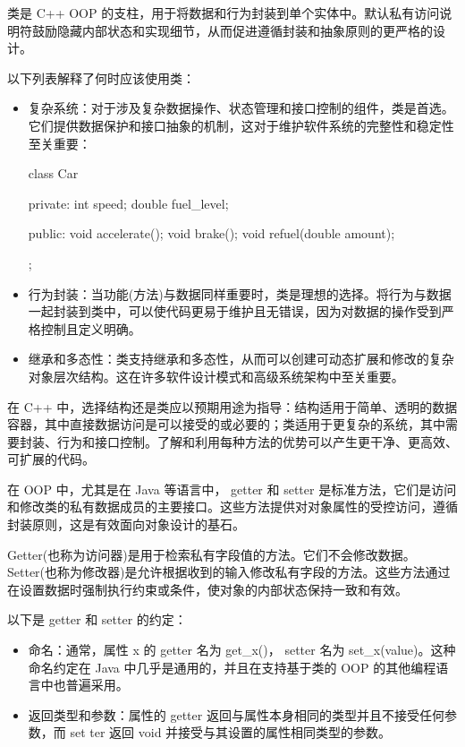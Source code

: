 类是 C++ OOP 的支柱，用于将数据和行为封装到单个实体中。默认私有访问说明符鼓励隐藏内部状态和实现细节，从而促进遵循封装和抽象原则的更严格的设计。

以下列表解释了何时应该使用类：

\begin{itemize}
\item
复杂系统：对于涉及复杂数据操作、状态管理和接口控制的组件，类是首选。它们提供数据保护和接口抽象的机制，这对于维护软件系统的完整性和稳定性至关重要：

\begin{cpp}
class Car {
private:
    int speed;
    double fuel_level;

public:
    void accelerate();
    void brake();
    void refuel(double amount);
};
\end{cpp}

\item
行为封装：当功能(方法)与数据同样重要时，类是理想的选择。将行为与数据一起封装到类中，可以使代码更易于维护且无错误，因为对数据的操作受到严格控制且定义明确。

\item
继承和多态性：类支持继承和多态性，从而可以创建可动态扩展和修改的复杂对象层次结构。这在许多软件设计模式和高级系统架构中至关重要。
\end{itemize}

在 C++ 中，选择结构还是类应以预期用途为指导：结构适用于简单、透明的数据容器，其中直接数据访问是可以接受的或必要的；类适用于更复杂的系统，其中需要封装、行为和接口控制。了解和利用每种方法的优势可以产生更干净、更高效、可扩展的代码。


在 OOP 中，尤其是在 Java 等语言中， getter 和 setter 是标准方法，它们是访问和修改类的私有数据成员的主要接口。这些方法提供对对象属性的受控访问，遵循封装原则，这是有效面向对象设计的基石。


Getter(也称为访问器)是用于检索私有字段值的方法。它们不会修改数据。 Setter(也称为修改器)是允许根据收到的输入修改私有字段的方法。这些方法通过在设置数据时强制执行约束或条件，使对象的内部状态保持一致和有效。

以下是 getter 和 setter 的约定：

\begin{itemize}
\item
命名：通常，属性 x 的 getter 名为 get\_x()， setter 名为 set\_x(value)。这种命名约定在 Java 中几乎是通用的，并且在支持基于类的 OOP 的其他编程语言中也普遍采用。

\item
返回类型和参数：属性的 getter 返回与属性本身相同的类型并且不接受任何参数，而 set ter 返回 void 并接受与其设置的属性相同类型的参数。
\end{itemize}

